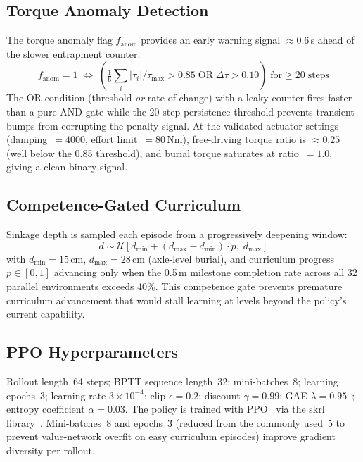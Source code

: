 \documentclass[conference]{IEEEtran}
\begin{document}
\subsection{Torque Anomaly Detection}
\label{sec:torque_anomaly}

The torque anomaly flag $f_{\text{anom}}$ provides an early warning signal
$\approx$0.6\,s ahead of the slower entrapment counter:
\begin{equation}
  f_\text{anom} = 1 \;\iff\;
  \left(
    \tfrac{1}{6}\textstyle\sum_i |\tau_i|/\tau_{\max} > 0.85
    \;\text{OR}\;
    \Delta\bar{\tau} > 0.10
  \right)
  \;\text{for} \geq 20\;\text{steps}
  \label{eq:anomaly}
\end{equation}
The OR condition (threshold \emph{or} rate-of-change) with a leaky counter fires
faster than a pure AND gate while the 20-step persistence threshold prevents
transient bumps from corrupting the penalty signal. At the validated actuator
settings (damping~$=4000$, effort limit~$=80$\,Nm), free-driving torque ratio
is ${\approx}0.25$ (well below the 0.85 threshold), and burial torque saturates
at ratio~$=1.0$, giving a clean binary signal.

\subsection{Competence-Gated Curriculum}

Sinkage depth is sampled each episode from a progressively deepening window:
\begin{equation}
  d \sim \mathcal{U}[d_{\min} + (d_{\max}-d_{\min})\cdot p,\;
  d_{\max}]
\end{equation}
with $d_{\min}{=}15$\,cm, $d_{\max}{=}28$\,cm (axle-level burial), and
curriculum progress $p \in [0,1]$ advancing only when the 0.5\,m milestone
completion rate across all 32 parallel environments exceeds 40\%. This
competence gate prevents premature curriculum advancement that would stall
learning at levels beyond the policy's current capability.

\subsection{PPO Hyperparameters}

Rollout length~64 steps; BPTT sequence length~32; mini-batches~8; learning
epochs~3; learning rate $3{\times}10^{-4}$; clip $\epsilon{=}0.2$;
discount $\gamma{=}0.99$; GAE $\lambda{=}0.95$~\cite{schulman2015gae}; entropy
coefficient $\alpha{=}0.03$. The policy is trained with
PPO~\cite{schulman2017ppo} via the skrl library~\cite{skrl}. Mini-batches~8 and
epochs~3 (reduced from the commonly used~5 to prevent value-network overfit on
easy curriculum episodes) improve gradient diversity per rollout.
\end{document}
